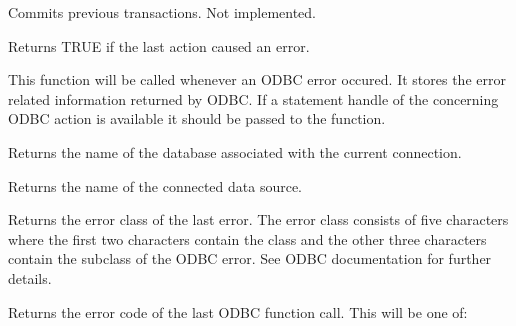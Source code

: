 

Commits previous transactions. Not implemented.



Returns TRUE if the last action caused an error.



This function will be called whenever an ODBC error occured. It stores the
error related information returned by ODBC. If a statement handle of the
concerning ODBC action is available it should be passed to the function.



Returns the name of the database associated with the current connection.



Returns the name of the connected data source.



Returns the error class of the last error. The error class consists of
five characters where the first two characters contain the class
and the other three characters contain the subclass of the ODBC error.
See ODBC documentation for further details.



Returns the error code of the last ODBC function call. This will be one of:

\begin{twocollist}\itemsep=0pt
\end{twocollist}

